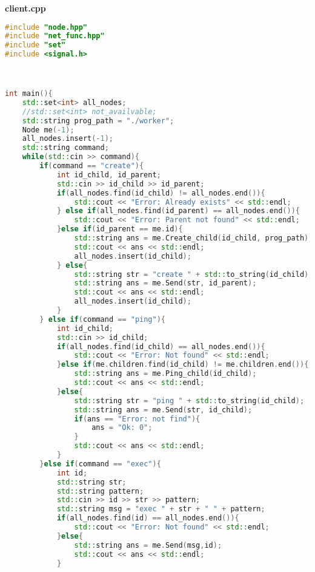 \documentclass[pdf, unicode, 12pt, a4paper,oneside,fleqn]{article}
\begin{document}
{\large\textbf{client.cpp}}

\begin{lstlisting}[language=C++]
#include "node.hpp"
#include "net_func.hpp"
#include "set"
#include <signal.h>



int main(){
    std::set<int> all_nodes;
    //std::set<int> not_availvable;
    std::string prog_path = "./worker";
    Node me(-1);
    all_nodes.insert(-1);
    std::string command;
    while(std::cin >> command){
        if(command == "create"){
            int id_child, id_parent;
            std::cin >> id_child >> id_parent;
            if(all_nodes.find(id_child) != all_nodes.end()){
                std::cout << "Error: Already exists" << std::endl;
            } else if(all_nodes.find(id_parent) == all_nodes.end()){
                std::cout << "Error: Parent not found" << std::endl;
            }else if(id_parent == me.id){
                std::string ans = me.Create_child(id_child, prog_path);
                std::cout << ans << std::endl;
                all_nodes.insert(id_child);
            } else{
                std::string str = "create " + std::to_string(id_child);
                std::string ans = me.Send(str, id_parent);
                std::cout << ans << std::endl;
                all_nodes.insert(id_child);
            }   
        } else if(command == "ping"){
            int id_child;
            std::cin >> id_child;
            if(all_nodes.find(id_child) == all_nodes.end()){
                std::cout << "Error: Not found" << std::endl;
            }else if(me.children.find(id_child) != me.children.end()){
                std::string ans = me.Ping_child(id_child);
                std::cout << ans << std::endl;
            }else{
                std::string str = "ping " + std::to_string(id_child);
                std::string ans = me.Send(str, id_child);
                if(ans == "Error: not find"){
                    ans = "Ok: 0";
                }
                std::cout << ans << std::endl;
            }
        }else if(command == "exec"){
            int id;
            std::string str;
            std::string pattern;
            std::cin >> id >> str >> pattern;
            std::string msg = "exec " + str + " " + pattern;
            if(all_nodes.find(id) == all_nodes.end()){
                std::cout << "Error: Not found" << std::endl;
            }else{
                std::string ans = me.Send(msg,id);
                std::cout << ans << std::endl;
            }
            

\end{lstlisting}
\end{document}
